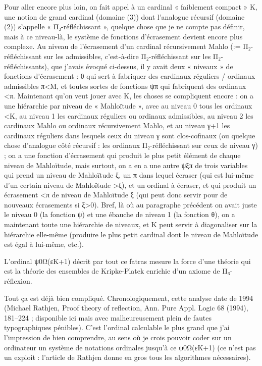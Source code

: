 \documentclass[10pt]{article}
\begin{document}
\begin{changemargin}{1cm}{1cm}
 
	Pour aller encore plus loin, on fait appel à un cardinal « faiblement compact » K, une notion de grand cardinal (domaine (3)) dont l'analogue récursif (domaine (2)) s'appelle « Π₃-réfléchissant », quelque chose que je ne compte pas définir, mais à ce niveau-là, le système de fonctions d'écrasement devient encore plus complexe. Au niveau de l'écrasement d'un cardinal récursivement Mahlo (:= Π₂-réfléchissant sur les admissibles, c'est-à-dire Π₂-réfléchissant sur les Π₂-réfléchissants), que j'avais évoqué ci-dessus, il y avait deux « niveaux » de fonctions d'écrasement : θ qui sert à fabriquer des cardinaux réguliers / ordinaux admissibles π<M, et toutes sortes de fonctions ψπ qui fabriquent des ordinaux <π. Maintenant qu'on veut jouer avec K, les choses se compliquent encore : on a une hiérarchie par niveau de « Mahloïtude », avec au niveau 0 tous les ordinaux <K, au niveau 1 les cardinaux réguliers ou ordinaux admissibles, au niveau 2 les cardinaux Mahlo ou ordinaux récursivement Mahlo, et au niveau γ+1 les cardinaux réguliers dans lesquels ceux du niveau γ sont clos-cofinaux (ou quelque chose d'analogue côté récursif : les ordinaux Π₂-réfléchissant sur ceux de niveau γ) ; on a une fonction d'écrasement qui produit le plus petit élément de chaque niveau de Mahloïtude, mais surtout, on a en a une autre ψξπ de trois variables qui prend un niveau de Mahloïtude ξ, un π dans lequel écraser (qui est lui-même d'un certain niveau de Mahloïtude >ξ), et un ordinal à écraser, et qui produit un écrasement <π de niveau de Mahloïtude ξ (qui peut donc servir pour de nouveaux écrasements si ξ>0). Bref, là où au paragraphe précédent on avait juste le niveau 0 (la fonction ψ) et une ébauche de niveau 1 (la fonction θ), on a maintenant toute une hiérarchie de niveaux, et K peut servir à diagonaliser sur la hiérarchie elle-même (produire le plus petit cardinal dont le niveau de Mahloïtude est égal à lui-même, etc.).

	L'ordinal ψ0Ω(εK+1) décrit par tout ce fatras mesure la force d'une théorie qui est la théorie des ensembles de Kripke-Platek enrichie d'un axiome de Π₃-réflexion.

	Tout ça est déjà bien compliqué. Chronologiquement, cette analyse date de 1994 (Michael Rathjen, Proof theory of reflection, Ann. Pure Appl. Logic 68 (1994), 181–224 ; disponible ici mais avec malheureusement plein de fautes typographiques pénibles). C'est l'ordinal calculable le plus grand que j'ai l'impression de bien comprendre, au sens où je crois pouvoir coder sur un ordinateur un système de notations ordinales jusqu'à ce ψ0Ω(εK+1) (ce n'est pas un exploit : l'article de Rathjen donne en gros tous les algorithmes nécessaires).


\end{changemargin}
\end{document}
